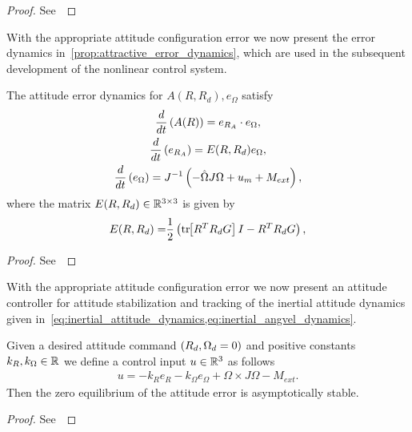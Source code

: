 \begin{proof}
    See~
\end{proof}

With the appropriate attitude configuration error we now present the error dynamics in~\cref{prop:attractive_error_dynamics}, which are used in the subsequent development of the nonlinear control system.
\begin{prop}\label{prop:attractive_error_dynamics}
    The attitude error dynamics for \( A(R, R_d), e_\Omega \) satisfy
	\begin{gather}
    	\frac{d }{d t} \left( A(R) \right) = e_{R_A} \cdot e_\Omega , \label{eq:A_dot} \\
		\frac{d }{d t} \left( e_{R_A} \right) = E(R, R_d) e_\Omega , \label{eq:eRA_dot} \\
        \frac{d }{d t} \left( e_\Omega \right) = J^{-1} \left( -\hat{\Omega} J \Omega + u_m + M_{ext} \right) , \label{eq:eW_dot}
	\end{gather}
	where the matrix \(E(R,R_d)\in \mathbb{R}^{3\times3} \) is given by
	\begin{align}
		E(R,R_d) = &\frac{1}{2} \left( \mathrm{tr}\negthickspace\left[ R^T R_d G \right]I - R^T R_d G \right) , \label{eq:E} \\
	\end{align}
\end{prop}
\begin{proof}
    See~
\end{proof}

With the appropriate attitude configuration error we now present an attitude controller for attitude stabilization and tracking of the inertial attitude dynamics given in~\cref{eq:inertial_attitude_dynamics,eq:inertial_angvel_dynamics}.

\begin{prop}\label{prop:att_control}
	Given a desired attitude command \( \left( R_d, \Omega_d = 0 \right) \) and positive constants \( k_R, k_\Omega \in \mathbb{R} \) we define a control input \( u \in \mathbb{R}^3 \) as follows
	\begin{gather}
        u = -k_R e_R - k_\Omega e_\Omega + \Omega \times J \Omega - M_{ext}. \label{eqn:nodist_control}
	\end{gather}
	Then the zero equilibrium of the attitude error is asymptotically stable.
\end{prop}
\begin{proof}
See~
\end{proof}

